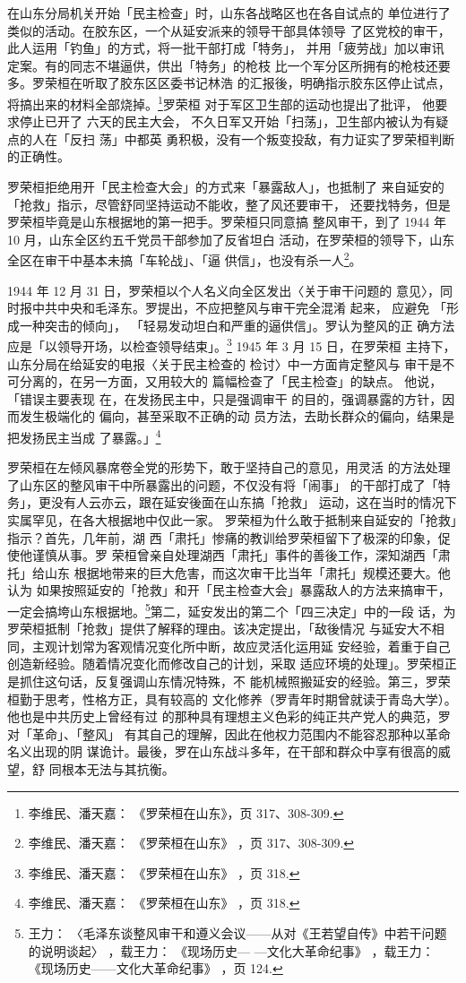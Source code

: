 在山东分局机关开始「民主检查」时，山东各战略区也在各自试点的 单位进行了
类似的活动。在胶东区，一个从延安派来的领导干部具体领导 了区党校的审干，
此人运用「钓鱼」的方式，将一批干部打成「特务」， 并用「疲劳战」加以审讯
定案。有的同志不堪逼供，供出「特务」的枪枝 比一个军分区所拥有的枪枝还要
多。罗荣桓在听取了胶东区区委书记林浩 的汇报後，明确指示胶东区停止试点，
将搞出来的材料全部烧掉。\footnote{李维民、潘天嘉： 《罗荣桓在山东》，页
317、308-309.}罗荣桓 对于军区卫生部的运动也提出了批评， 他要求停止已开了
六天的民主大会， 不久日军又开始「扫荡」，卫生部内被认为有疑点的人在「反扫
荡」中都英 勇积极，没有一个叛变投敌，有力证实了罗荣桓判断的正确性。
 
罗荣桓拒绝用开「民主检查大会」的方式来「暴露敌人」，也抵制了
来自延安的「抢救」指示，尽管舒同坚持运动不能收，整了风还要审干，
还要找特务，但是罗荣桓毕竟是山东根据地的第一把手。罗荣桓只同意搞
整风审干，到了 1944 年 10 月，山东全区约五千党员干部参加了反省坦白
活动，在罗荣桓的领导下，山东全区在审干中基本未搞「车轮战」、「逼
供信」，也没有杀一人\footnote{李维民、潘天嘉：
《罗荣桓在山东》
，页 317、308-309.}。

1944 年 12 月 31 日，罗荣桓以个人名义向全区发出〈关于审干问题的 意见〉，同
时报中共中央和毛泽东。罗提出，不应把整风与审干完全混淆 起来， 应避免
「形成一种突击的倾向」， 「轻易发动坦白和严重的逼供信」。罗认为整风的正
确方法应是「以领导开场，以检查领导结束」。\footnote{李维民、潘天嘉：
《罗荣桓在山东》
，页 318.} 1945 年 3 月 15 日，在罗荣桓
主持下，山东分局在给延安的电报〈关于民主检查的 检讨〉中一方面肯定整风与
审干是不可分离的，在另一方面，又用较大的 篇幅检查了「民主检查」的缺点。
他说， 「错误主要表现
在，在发扬民主中，只是强调审干 的目的，强调暴露的方针，因而发生极端化的
偏向，甚至采取不正确的动 员方法，去助长群众的偏向，结果是把发扬民主当成
了暴露。」\footnote{李维民、潘天嘉：
《罗荣桓在山东》
，页 318.}

罗荣桓在左倾风暴席卷全党的形势下，敢于坚持自己的意见，用灵活
的方法处理了山东区的整风审干中所暴露出的问题，不仅没有将「闹事」
的干部打成了「特务」，更没有人云亦云，跟在延安後面在山东搞「抢救」
运动，这在当时的情况下实属罕见，在各大根据地中仅此一家。
罗荣桓为什么敢于抵制来自延安的「抢救」指示？首先，几年前，湖
西「肃托」惨痛的教训给罗荣桓留下了极深的印象，促使他谨慎从事。罗
荣桓曾亲自处理湖西「肃托」事件的善後工作，深知湖西「肃托」给山东
根据地带来的巨大危害，而这次审干比当年「肃托」规模还要大。他认为
如果按照延安的「抢救」和开「民主检查大会」暴露敌人的方法来搞审干，
一定会搞垮山东根据地。\footnote{王力：
〈毛泽东谈整风审干和遵义会议——从对《王若望自传》中若干问题的说明谈起〉
，载王力：
《现场历史—
—文化大革命纪事》
，载王力：
《现场历史——文化大革命纪事》
，页 124.}第二，延安发出的第二个「四三决定」中的一段
话，为罗荣桓抵制「抢救」提供了解释的理由。该决定提出，「敌後情况
与延安大不相同，主观计划常为客观情况变化所中断，故应灵活化运用延
安经验，着重于自己创造新经验。随着情况变化而修改自己的计划，采取
适应环境的处理」。罗荣桓正是抓住这句话，反复强调山东情况特殊，不
能机械照搬延安的经验。第三，罗荣桓勤于思考，性格方正，具有较高的
文化修养（罗青年时期曾就读于青岛大学）。他也是中共历史上曾经有过
的那种具有理想主义色彩的纯正共产党人的典范，罗对「革命」、「整风」
有其自己的理解，因此在他权力范围内不能容忍那种以革命名义出现的阴
谋诡计。最後，罗在山东战斗多年，在干部和群众中享有很高的威望，舒
同根本无法与其抗衡。

